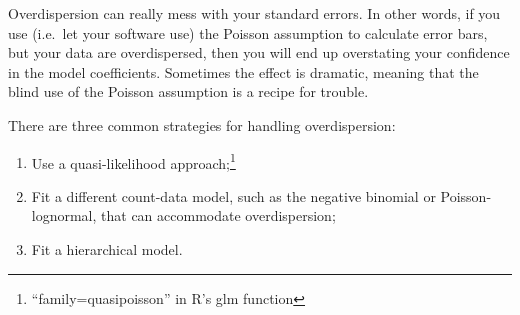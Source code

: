 \documentclass[11pt]{article}
\newcommand{\1}[1]{\mathbf{1}_{\{ {#1} \}}}
\begin{document}
Overdispersion can really mess with your standard errors.  In other words, if you use (i.e.~let your software use) the Poisson assumption to calculate error bars, but your data are overdispersed, then you will end up overstating your confidence in the model coefficients.  Sometimes the effect is dramatic, meaning that the blind use of the Poisson assumption is a recipe for trouble.

There are three common strategies for handling overdispersion:
\begin{enumerate}
\item Use a quasi-likelihood approach;\footnote{``family=quasipoisson'' in R's glm function}
\item Fit a different count-data model, such as the negative binomial or Poisson-lognormal, that can accommodate overdispersion;
\item Fit a hierarchical model.
\end{enumerate}
\end{document}
